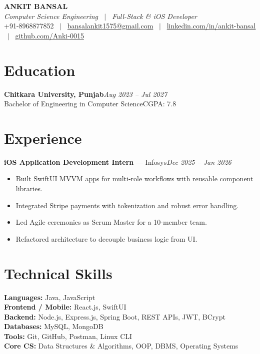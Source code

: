 \documentclass[a4paper,10pt]{article}
\begin{document}
\pagestyle{empty}

\begin{center}
  {\LARGE\bfseries\color{dark} ANKIT BANSAL}\\[3pt]
  {\small\textit{\color{mid} Computer Science Engineering \ $|$ \ Full-Stack \& iOS Developer}}\\[4pt]
  {\small
    +91-8968877852 \ $|$ \
    \href{mailto:bansalankit1575@gmail.com}{bansalankit1575@gmail.com} \ $|$ \
    \href{https://www.linkedin.com/in/ankit-bansal-50828a199/}{linkedin.com/in/ankit-bansal} \ $|$ \
    \href{https://github.com/Anki-0015}{github.com/Anki-0015}
  }
\end{center}

\section*{Education}
\textbf{Chitkara University, Punjab}\hfill{\small\textit{\color{mid}Aug 2023 -- Jul 2027}}\\
{\small\color{mid}Bachelor of Engineering in Computer Science}\hfill{\small\color{mid}CGPA: 7.8}

\section*{Experience}
\textbf{iOS Application Development Intern} \textnormal{---} Infosys\hfill{\small\textit{\color{mid}Dec 2025 -- Jan 2026}}
\begin{itemize}
  \item Built SwiftUI MVVM apps for multi-role workflows with reusable component libraries.
  \item Integrated Stripe payments with tokenization and robust error handling.
  \item Led Agile ceremonies as Scrum Master for a 10-member team.
  \item Refactored architecture to decouple business logic from UI.
\end{itemize}

\section*{Technical Skills}
\textbf{Languages:} Java, JavaScript\\
\textbf{Frontend / Mobile:} React.js, SwiftUI\\
\textbf{Backend:} Node.js, Express.js, Spring Boot, REST APIs, JWT, BCrypt\\
\textbf{Databases:} MySQL, MongoDB\\
\textbf{Tools:} Git, GitHub, Postman, Linux CLI\\
\textbf{Core CS:} Data Structures \& Algorithms, OOP, DBMS, Operating Systems
\end{document}
